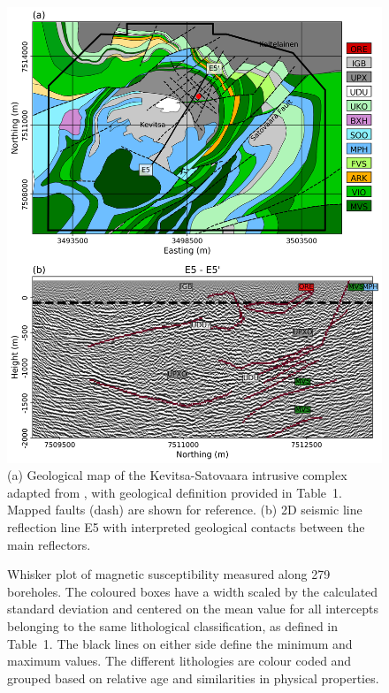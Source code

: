 \documentclass[paper]{geophysics}
\begin{document}
\begin{figure}[p!]
\includegraphics[width=\columnwidth]{Figures/Figure8.png}
\caption{(a) Geological map of the Kevitsa-Satovaara intrusive complex adapted from \cite{Koivisto2015}, with geological definition provided in Table~1. Mapped faults (dash) are shown for reference. (b) 2D seismic line reflection line E5 with interpreted geological contacts between the main reflectors.}
\label{Kevitsa_Geology}
\end{figure}

\begin{figure}[p!]
\caption{Whisker plot of magnetic susceptibility measured along 279 boreholes. The coloured boxes have a width scaled by the calculated standard deviation and centered on the mean value for all intercepts belonging to the same lithological classification, as defined in Table~1. The black lines on either side define the minimum and maximum values. The different lithologies are colour coded and grouped based on relative age and similarities in physical properties.}
\label{Kevitsa_PhysProp}
\end{figure}
\end{document}
